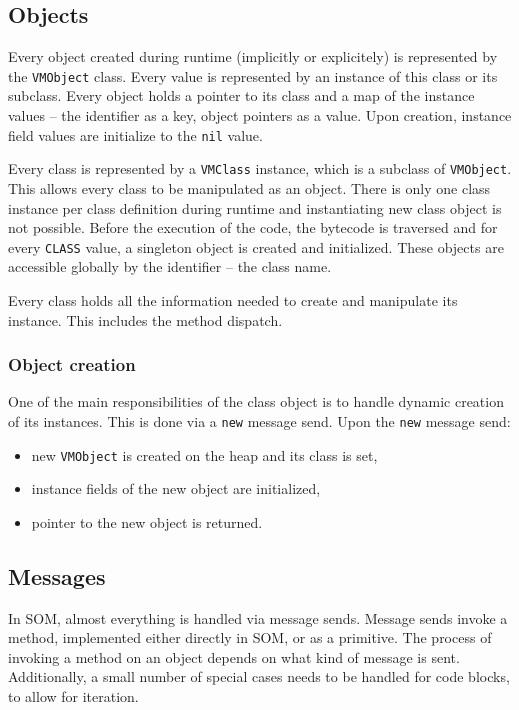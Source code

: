 \documentclass[thesis=M,english]{FITthesis}[2019/12/23]
\begin{document}
\subsection{Objects}
Every object created during runtime (implicitly or explicitely) is represented by the \texttt{VMObject} class. Every value is represented by an instance of this
class or its subclass. Every object holds a pointer to its class and a map of the instance values -- the identifier as a key, object pointers as a value. Upon creation,
instance field values are initialize to the \texttt{nil} value.

Every class is represented by a \texttt{VMClass} instance, which is a subclass of \texttt{VMObject}. This allows every class to be manipulated as an object. There
is only one class instance per class definition during runtime and instantiating new class object is not possible. Before the execution of the code, the bytecode
is traversed and for every \texttt{CLASS} value, a singleton object is created and initialized. These objects are accessible globally by the identifier -- the class name.

Every class holds all the information needed to create and manipulate its instance. This includes the method dispatch.

\subsubsection{Object creation}
One of the main responsibilities of the class object is to handle dynamic creation of its instances. This is done via a \texttt{new} message send.
Upon the \texttt{new} message send:
\begin{itemize}
	\item new \texttt{VMObject} is created on the heap and its class is set,
	\item instance fields of the new object are initialized,
	\item pointer to the new object is returned.
\end{itemize}

\subsection{Messages}
In SOM, almost everything is handled via message sends. Message sends invoke a method, implemented either directly in SOM, or as a primitive.
The process of invoking a method on an object depends on what kind of message is sent. Additionally, a small number of special cases needs to
be handled for code blocks, to allow for iteration.
\end{document}

